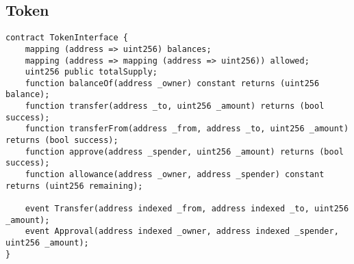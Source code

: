 \documentclass[9pt,oneside]{amsart}
\begin{document}
\subsection{Token}
\begin{verbatim}
contract TokenInterface {
    mapping (address => uint256) balances;
    mapping (address => mapping (address => uint256)) allowed;
    uint256 public totalSupply;
    function balanceOf(address _owner) constant returns (uint256 balance);
    function transfer(address _to, uint256 _amount) returns (bool success);
    function transferFrom(address _from, address _to, uint256 _amount) returns (bool success);
    function approve(address _spender, uint256 _amount) returns (bool success);
    function allowance(address _owner, address _spender) constant returns (uint256 remaining);

    event Transfer(address indexed _from, address indexed _to, uint256 _amount);
    event Approval(address indexed _owner, address indexed _spender, uint256 _amount);
}
\end{verbatim} 
\end{document}
